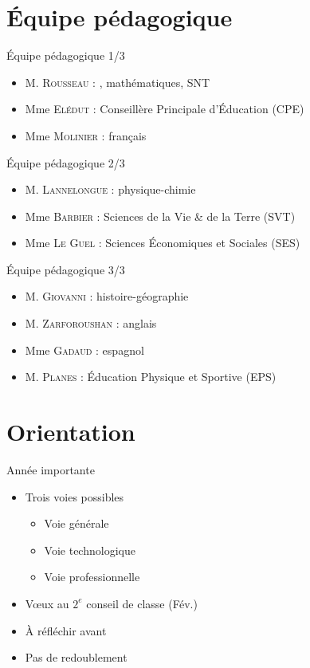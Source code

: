 \documentclass[17pt,xcolor=x11names]{beamer}
\begin{document}
\section*{Équipe pédagogique}
\begin{frame}{Équipe pédagogique 1/3}
  \begin{itemize}
    \item M. \textsc{Rousseau} : , mathématiques, SNT
    \item Mme \textsc{Elédut} : Conseillère Principale d'Éducation (CPE)
    \item Mme \textsc{Molinier} : français
  \end{itemize}
\end{frame}
\begin{frame}{Équipe pédagogique 2/3}
  \begin{itemize}
    \item M. \textsc{Lannelongue} : physique-chimie
    \item Mme \textsc{Barbier} : Sciences de la Vie \& de la Terre (SVT)
    \item Mme \textsc{Le Guel} : Sciences Économiques et Sociales (SES)
  \end{itemize}
\end{frame}
\begin{frame}{Équipe pédagogique 3/3}
  \begin{itemize}
    \item M. \textsc{Giovanni} : histoire-géographie
    \item M. \textsc{Zarforoushan} : anglais
    \item Mme \textsc{Gadaud} : espagnol
    \item M. \textsc{Planes} : Éducation Physique et Sportive (EPS)
  \end{itemize}
\end{frame}

\section*{Orientation}
\begin{frame}{Année importante}
  \begin{itemize}
    \item Trois voies possibles
      \begin{itemize}
        \item Voie générale
        \item Voie technologique
        \item Voie professionnelle
      \end{itemize}
    \item Vœux au $2^e$ conseil de classe (Fév.)
    \item À réfléchir avant
    \item Pas de redoublement
  \end{itemize}
\end{frame}
\end{document}
